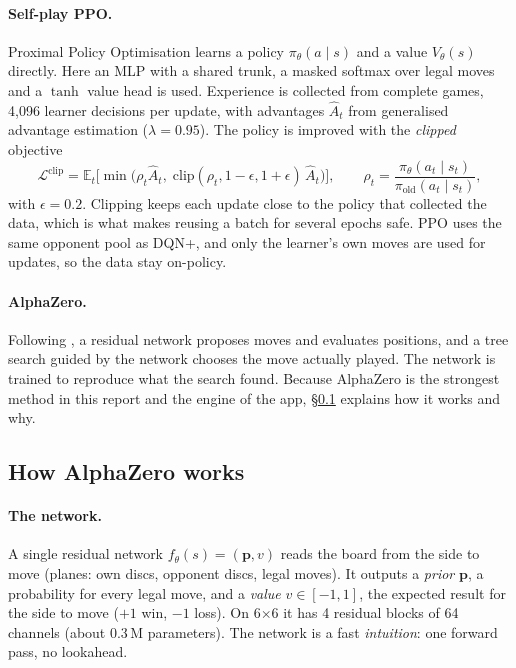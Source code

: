 \documentclass[11pt]{article}
\newcommand{\bx}[1]{#1$\times$#1}
\begin{document}
\paragraph{Self-play PPO.} Proximal Policy Optimisation \cite{schulman2017} learns
a policy $\pi_\theta(a\mid s)$ and a value $V_\theta(s)$ directly. Here an MLP
with a shared trunk, a masked softmax over legal moves and a $\tanh$ value head
is used. Experience is collected from complete games, 4{,}096 learner decisions
per update, with advantages $\hat A_t$ from generalised advantage estimation
($\lambda=0.95$). The policy is improved with the \emph{clipped} objective
\[
  \mathcal{L}^{\text{clip}} = \mathbb{E}_t\Big[\min\big(\rho_t \hat A_t,\;
  \mathrm{clip}(\rho_t, 1-\epsilon, 1+\epsilon)\,\hat A_t\big)\Big],\qquad
  \rho_t = \frac{\pi_\theta(a_t\mid s_t)}{\pi_{\text{old}}(a_t\mid s_t)},
\]
with $\epsilon = 0.2$. Clipping keeps each update close to the policy that
collected the data, which is what makes reusing a batch for several epochs
safe. PPO uses the same opponent pool as DQN+, and only the learner's own moves
are used for updates, so the data stay on-policy.

\paragraph{AlphaZero.} Following \cite{silver2018}, a residual network proposes
moves and evaluates positions, and a tree search guided by the network chooses
the move actually played. The network is trained to reproduce what the search
found. Because AlphaZero is the strongest method in this report and the engine
of the app, \S\ref{sec:az} explains how it works and why.

\subsection{How AlphaZero works}
\label{sec:az}

\paragraph{The network.} A single residual network
$f_\theta(s) = (\mathbf{p}, v)$ reads the board from the side to move (planes:
own discs, opponent discs, legal moves). It outputs a \emph{prior}
$\mathbf{p}$, a probability for every legal move, and a \emph{value}
$v\in[-1,1]$, the expected result for the side to move ($+1$ win, $-1$ loss).
On \bx{6} it has 4 residual blocks of 64 channels (about 0.3\,M parameters).
The network is a fast \emph{intuition}: one forward pass, no lookahead.
\end{document}
